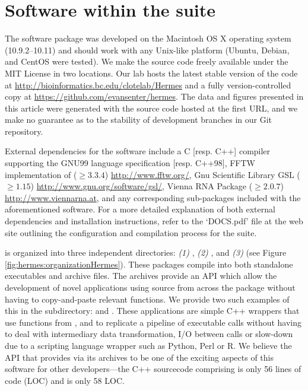 \section{Software within the \hermes suite}
\label{sec:hermes:layout}
The \hermes software package was developed on the Macintosh OS X
operating system (10.9.2--10.11) and should work with any Unix-like platform
(Ubuntu, Debian, and CentOS were tested). We make the source code freely
available under the MIT License in two locations.
Our lab hosts the latest stable version of the code at
\url{http://bioinformatics.bc.edu/clotelab/Hermes} and a fully
version-controlled copy at \url{https://github.com/evansenter/hermes}.
The data and figures presented in this article were generated with the
source code hosted at the first URL, and we make no guarantee as to
the stability of development branches in our Git repository.

External dependencies for the software include a C [resp. C++]
compiler supporting the GNU99 language specification [resp. C++98],
FFTW implementation of \fft \cite{fftw05} ($\geq
3.3.4$) \url{http://www.fftw.org/}, Gnu Scientific Library GSL ($\geq
1.15$) \url{http://www.gnu.org/software/gsl/}, Vienna RNA Package
\cite{Lorenz.amb11} ($\geq 2.0.7$) \url{http://www.viennarna.at}, and
any corresponding sub-packages included with the aforementioned
software. For a more detailed explanation of both external
dependencies and installation instructions, refer to the
`DOCS.pdf' file at the web site
outlining the configuration and compilation process for the \hermes
suite.

\hermes is organized into three independent directories:
{\em (1)\;} \ffttwo, {\em (2)\;} \rnamfpt, and {\em (3)\;} \rnaeq (see
Figure \ref{fig:hermes:organizationHermes}). These packages compile into both
standalone executables and archive files. The archives provide an
API which allow the development of novel applications using source
from across the \hermes package without having to copy-and-paste
relevant functions. We provide two such examples of this in the
 subdirectory: \fftmfpt and \ffteq. These applications
are simple C++ wrappers that use functions from \ffttwo, \rnamfpt and
\rnaeq to replicate a pipeline of executable calls without having to
deal with intermediary data transformation, I/O between calls or
slow-down due to a scripting language wrapper such as Python, Perl or R.
We believe
the API that \hermes provides via its archives to be one of the exciting
aspects of this software for other developers---the C++ sourcecode comprising
\fftmfpt is only 56 lines of code (LOC) and \ffteq is only 58 LOC.

